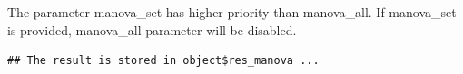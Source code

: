 \documentclass[
]{book}
\newenvironment{Shaded}{\begin{snugshade}}{\end{snugshade}}
\newcommand{\AttributeTok}[1]{\textcolor[rgb]{0.77,0.63,0.00}{#1}}
\newcommand{\CommentTok}[1]{\textcolor[rgb]{0.56,0.35,0.01}{\textit{#1}}}
\newcommand{\FunctionTok}[1]{\textcolor[rgb]{0.00,0.00,0.00}{#1}}
\newcommand{\NormalTok}[1]{#1}
\newcommand{\SpecialCharTok}[1]{\textcolor[rgb]{0.00,0.00,0.00}{#1}}
\newcommand{\StringTok}[1]{\textcolor[rgb]{0.31,0.60,0.02}{#1}}
\begin{document}
The parameter manova\_set has higher priority than manova\_all. If manova\_set is provided, manova\_all parameter will be disabled.

\begin{Shaded}
\end{Shaded}

\begin{verbatim}
## The result is stored in object$res_manova ...
\end{verbatim}
\end{document}
